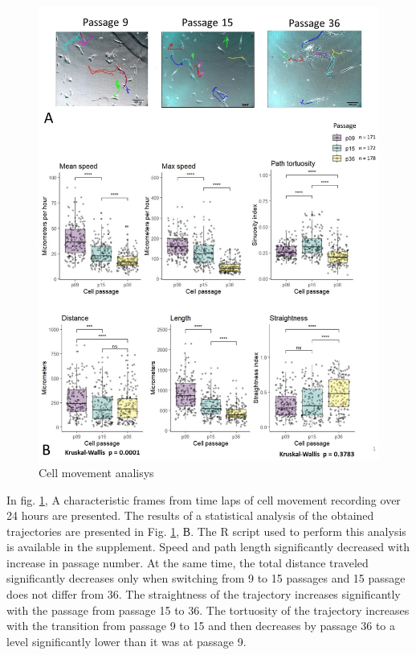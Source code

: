 \documentclass[english,authoryear]{elsarticle}
\begin{document}
\begin{figure}
  \includegraphics[width=1\linewidth]{fig_traj.jpg}
  \caption{Cell movement analisys}
  \label{traj}
  \centering
\end{figure}

In fig. \ref{traj}, A characteristic frames from time laps of cell movement recording over 24 hours are presented.
The results of a statistical analysis of the obtained trajectories are presented in Fig. \ref{traj}, В.
The R script used to perform this analysis is available in the supplement.
Speed and path length significantly decreased with increase in passage number.
At the same time, the total distance traveled significantly decreases only when switching from 9 to 15 passages and 15 passage does not differ from 36.
The straightness of the trajectory increases significantly with the passage from passage 15 to 36.
The tortuosity of the trajectory increases with the transition from passage 9 to 15 and then decreases by passage 36 to a level significantly lower than it was at passage 9.
\end{document}
